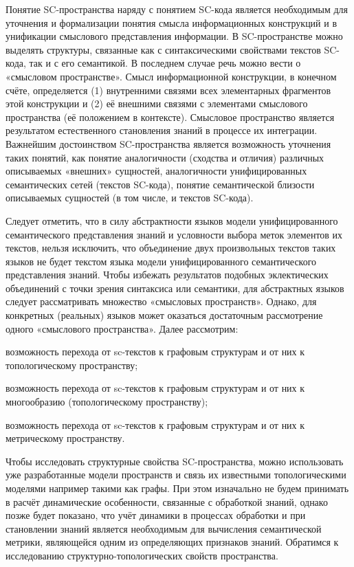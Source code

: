 Понятие SC-пространства наряду с понятием SC-кода является необходимым для уточнения и формализации понятия смысла информационных конструкций и в унификации смыслового представления информации. В SC-пространстве можно выделять структуры, связанные как с синтаксическими свойствами текстов SC-кода, так и с его семантикой. В последнем случае речь можно вести о «смысловом пространстве». Смысл информационной конструкции, в конечном счёте, определяется (1) внутренними связями всех элементарных фрагментов этой конструкции и (2) её внешними связями с элементами смыслового пространства (её положением в контексте). Смысловое пространство является результатом естественного становления знаний в процессе их интеграции.
Важнейшим достоинством SC-пространства является возможность уточнения таких понятий, как понятие аналогичности (сходства и отличия) различных описываемых «внешних» сущностей, аналогичности унифицированных семантических сетей (текстов SC-кода), понятие семантической близости описываемых сущностей (в том числе, и текстов SC-кода).

Следует отметить, что в силу абстрактности языков модели унифицированного семантического представления знаний и условности выбора меток элементов их текстов, нельзя исключить, что объединение двух произвольных текстов таких языков не будет текстом языка модели унифицированного семантического представления знаний. Чтобы избежать результатов подобных эклектических объединений с точки зрения синтаксиса или семантики, для абстрактных языков следует рассматривать множество «смысловых пространств». Однако, для конкретных (реальных) языков может оказаться достаточным рассмотрение одного «смыслового пространства».
Далее рассмотрим:

\begin{textitemize}
	\item возможность перехода от sc-текстов к графовым структурам и от них к топологическому пространству;
	\item возможность перехода от sc-текстов к графовым структурам и от них к многообразию (топологическому пространству);
	\item возможность перехода от sc-текстов к графовым структурам и от них к метрическому пространству.
\end{textitemize}

Чтобы исследовать структурные свойства SC-пространства, можно использовать уже разработанные модели пространств и связь их известными топологическими моделями например такими как графы. При этом изначально не будем принимать в расчёт динамические особенности, связанные с обработкой знаний, однако позже будет показано, что учёт динамики в процессах обработки и при становлении знаний является необходимым для вычисления семантической метрики, являющейся одним из определяющих признаков знаний.
Обратимся к исследованию структурно-топологических свойств пространства.

